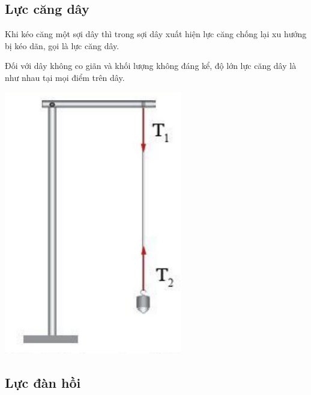 \subsection{Lực căng dây}
\begin{minipage}[l]{0.6\textwidth}
	Khi kéo căng một sợi dây thì trong sợi dây xuất hiện lực căng chống lại xu hướng bị kéo dãn, gọi là lực căng dây.
	
	
	
	Đối với dây không co giãn và khối lượng không đáng kể, độ lớn lực căng dây là như nhau tại mọi điểm trên dây. 
	
\end{minipage}
\begin{minipage}[r]{0.4\textwidth}
	\begin{center}
		\includegraphics[scale=0.5]{../figs/G10-18-1}
	\end{center}
\end{minipage}

\subsection{Lực đàn hồi}
